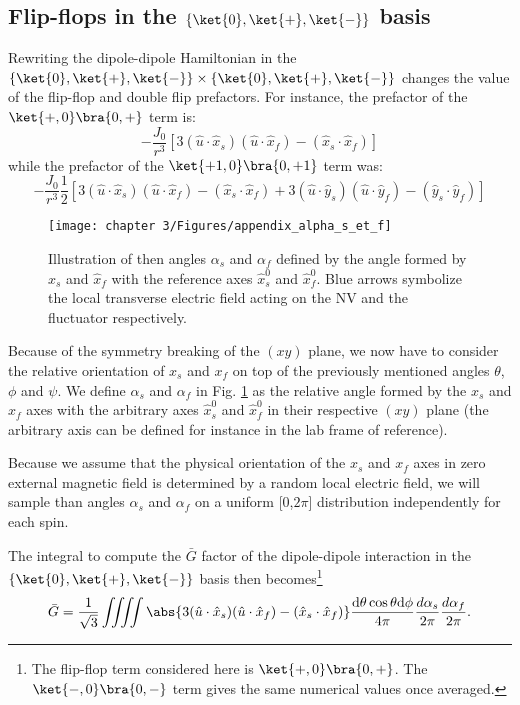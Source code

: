 \documentclass[a4paper, 11pt]{report}
\begin{document}
\subsection{Flip-flops in the $\{ \ket{0}, \ket{+}, \ket{-}\}$ basis}
\label{sec flip-flop +/-}
Rewriting the dipole-dipole Hamiltonian in the $\{ \ket{0}, \ket{+}, \ket{-}\} \times \{ \ket{0}, \ket{+}, \ket{-}\}$ changes the value of the flip-flop and double flip prefactors. For instance, the prefactor of the $\ket{+,0}\bra{0,+}$ term is: \begin{equation}
-\frac{J_0}{r^3}\left[3(\hat{u}\cdot\hat{x}_s)(\hat{u}\cdot\hat{x}_f) - (\hat{x}_s \cdot \hat{x}_f)\right]
\end{equation}
while the prefactor of the $\ket{+1,0}\bra{0,+1}$ term was: \begin{equation}
-\frac{J_0}{r^3}\frac{1}{2}\left[3(\hat{u}\cdot\hat{x}_s)(\hat{u}\cdot\hat{x}_f) - (\hat{x}_s \cdot \hat{x}_f) + 3(\hat{u}\cdot\hat{y}_s)(\hat{u}\cdot\hat{y}_f) - (\hat{y}_s \cdot \hat{y}_f) \right] 
\end{equation}

\begin{figure}[h]
\centering
\texttt{[image: chapter 3/Figures/appendix\_alpha\_s\_et\_f]}
\caption{Illustration of then angles $\alpha_s$ and $\alpha_f$ defined by the angle formed by $\hat x_s$ and $\hat x_f$ with the reference axes $\hat x_s^0$ and $\hat x_f^0$. Blue arrows symbolize the local transverse electric field acting on the NV and the fluctuator respectively.}
\label{alpha s et f}
\end{figure}

Because of the symmetry breaking of the $(xy)$ plane, we now have to consider the relative orientation of $x_s$ and $x_f$ on top of the previously mentioned angles $\theta$, $\phi$ and $\psi$. We define $\alpha_s$ and $\alpha_f$ in Fig. \ref{alpha s et f} as the relative angle formed by the $x_s$ and $x_f$ axes with the arbitrary axes $\hat x_s^0$ and $\hat x_f^0$ in their respective $(xy)$ plane (the arbitrary axis can be defined for instance in the lab frame of reference). 

Because we assume that the physical orientation of the $x_s$ and $x_f$ axes in zero external magnetic field is determined by a random local electric field, we will sample than angles $\alpha_s$ and $\alpha_f$ on a uniform [0,$2\pi$] distribution independently for each spin.

The integral to compute the $\bar G$ factor of the dipole-dipole interaction in the $\{ \ket{0}, \ket{+}, \ket{-}\}$ basis then becomes\footnote{The flip-flop term considered here is $\ket{+,0}\bra{0,+}$. The $\ket{-,0}\bra{0,-}$ term gives the same numerical values once averaged.}
\begin{equation}
\bar G= \frac{1}{\sqrt{3}} \iiiint \abs{3(\hat{u}\cdot\hat{x}_s)(\hat{u}\cdot\hat{x}_f) - (\hat{x}_s \cdot \hat{x}_f)} \frac{\rm d\theta \cos \theta \rm d\phi}{4 \pi} \frac{d \alpha_s}{2\pi} \frac{d \alpha_f}{2\pi}.
\end{equation}
\end{document}

